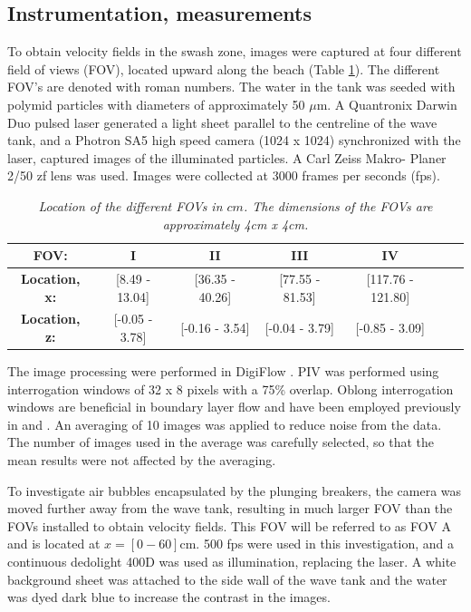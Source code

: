 \documentclass[a4paper, 11pt, english, twoside, openright]{article}
\begin{document}
\subsection{Instrumentation, measurements}
To obtain velocity fields in the swash zone, images were captured at four different field of views (FOV), located upward along the beach (Table \ref{tab:loc}). The different FOV's are denoted with roman numbers. The water in the tank was seeded with polymid particles with diameters of approximately 50 $\mu$m. A Quantronix Darwin Duo pulsed laser generated a light sheet parallel to the centreline of the wave tank, and a Photron SA5 high speed camera (1024 x 1024) synchronized with the laser, captured images of the illuminated particles. A Carl Zeiss Makro- Planer 2/50 zf lens was used. Images were collected at 3000 frames per seconds (fps).
 \begin{table}[]
 \centering
\caption{\textit{Location of the different FOVs  in $cm$. The dimensions of the FOVs are approximately 4cm x 4cm.}}
\begin{tabular}{|c|c|c|c|c|c|c|}
\hline
\textbf{FOV:}      & I                   & II                 & III     & IV \\ \hline
\textbf{Location, x:}& {[}8.49 - 13.04{]} & {[}36.35 - 40.26{]} & {[}77.55 - 81.53{]} & {[}117.76 - 121.80{]} 
 \\ \hline
\textbf{Location, z:}&  {[}-0.05 - 3.78{]} & {[}-0.16 - 3.54{]} & {[}-0.04 - 3.79{]} & {[}-0.85 - 3.09{]} 
\\ \hline
\end{tabular}
\label{tab:loc}
\end{table}
The image processing were performed in DigiFlow \citep{digiflow}. PIV was performed using interrogation windows of 32 x 8 pixels with a 75\% overlap. Oblong interrogation windows are beneficial in boundary layer flow and have been employed previously in \cite{liu2007boundary} and \cite{pedersen2013runup}. An averaging of 10 images was applied to reduce noise from the data. The number of images used in the average was carefully selected, so that the mean results were not affected by the averaging. 

To investigate air bubbles encapsulated by the plunging breakers, the camera was moved further away from the wave tank, resulting in much larger FOV than the FOVs installed to obtain velocity fields. This FOV will be referred to as FOV A and is located at $x=[0-60]$cm.  500 fps were used in this investigation, and a continuous dedolight 400D was used as illumination, replacing the laser. A white background sheet was attached to the side wall of  the wave tank and the water was dyed dark blue to increase the contrast in the images.
\end{document}
